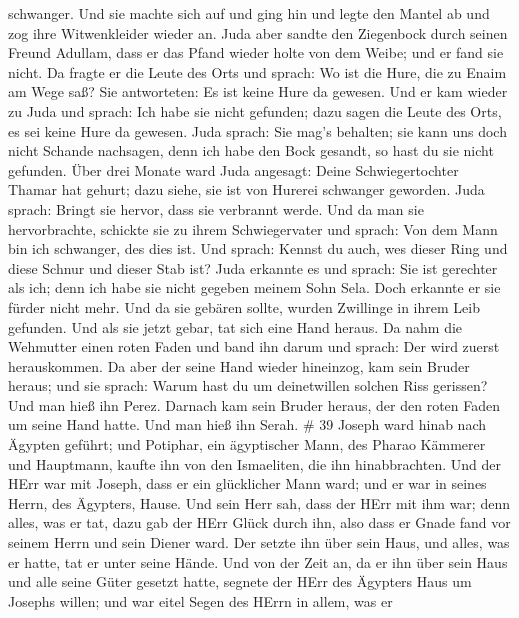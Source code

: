 schwanger.  Und sie machte sich auf und ging hin und legte
den Mantel ab und zog ihre Witwenkleider wieder an.  Juda
aber sandte den Ziegenbock durch seinen Freund Adullam, dass er das
Pfand wieder holte von dem Weibe; und er fand sie nicht. 
Da fragte er die Leute des Orts und sprach: Wo ist die Hure, die zu
Enaim am Wege saß? Sie antworteten: Es ist keine Hure da gewesen.
 Und er kam wieder zu Juda und sprach: Ich habe sie nicht
gefunden; dazu sagen die Leute des Orts, es sei keine Hure da gewesen.
 Juda sprach: Sie mag's behalten; sie kann uns doch nicht
Schande nachsagen, denn ich habe den Bock gesandt, so hast du sie nicht
gefunden.  Über drei Monate ward Juda angesagt: Deine
Schwiegertochter Thamar hat gehurt; dazu siehe, sie ist von Hurerei
schwanger geworden. Juda sprach: Bringt sie hervor, dass sie verbrannt
werde.  Und da man sie hervorbrachte, schickte sie zu ihrem
Schwiegervater und sprach: Von dem Mann bin ich schwanger, des dies ist.
Und sprach: Kennst du auch, wes dieser Ring und diese Schnur und dieser
Stab ist?  Juda erkannte es und sprach: Sie ist gerechter
als ich; denn ich habe sie nicht gegeben meinem Sohn Sela. Doch erkannte
er sie fürder nicht mehr.  Und da sie gebären sollte,
wurden Zwillinge in ihrem Leib gefunden.  Und als sie jetzt
gebar, tat sich eine Hand heraus. Da nahm die Wehmutter einen roten
Faden und band ihn darum und sprach: Der wird zuerst herauskommen.
 Da aber der seine Hand wieder hineinzog, kam sein Bruder
heraus; und sie sprach: Warum hast du um deinetwillen solchen Riss
gerissen? Und man hieß ihn Perez.  Darnach kam sein Bruder
heraus, der den roten Faden um seine Hand hatte. Und man hieß ihn Serah.
\# 39  Joseph ward hinab nach Ägypten geführt; und Potiphar,
ein ägyptischer Mann, des Pharao Kämmerer und Hauptmann, kaufte ihn von
den Ismaeliten, die ihn hinabbrachten.  Und der HErr war mit
Joseph, dass er ein glücklicher Mann ward; und er war in seines Herrn,
des Ägypters, Hause.  Und sein Herr sah, dass der HErr mit
ihm war; denn alles, was er tat, dazu gab der HErr Glück durch ihn,
 also dass er Gnade fand vor seinem Herrn und sein Diener
ward. Der setzte ihn über sein Haus, und alles, was er hatte, tat er
unter seine Hände.  Und von der Zeit an, da er ihn über sein
Haus und alle seine Güter gesetzt hatte, segnete der HErr des Ägypters
Haus um Josephs willen; und war eitel Segen des HErrn in allem, was er
